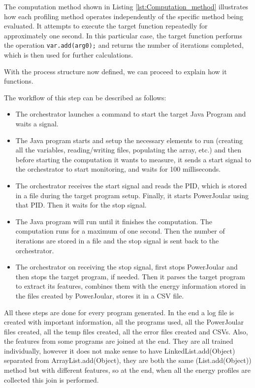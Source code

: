 The computation method shown in Listing \ref{lst:Computation_method} illustrates how each profiling method operates independently of the specific method being evaluated. It attempts to execute the target function repeatedly for approximately one second. In this particular case, the target function performs the operation \texttt{var.add(arg0);} and returns the number of iterations completed, which is then used for further calculations.


With the process structure now defined, we can proceed to explain how it functions.

The workflow of this step can be described as follows:

\begin{itemize}
  \item The orchestrator launches a command to start the target Java Program and waits a signal.
  \item The Java program starts and setup the necessary elements to run (creating all the variables, reading/writing files, populating the array, etc.) and then before starting the computation it wants to measure, it sends a start signal to the orchestrator to start monitoring, and waits for 100 milliseconds.
  \item The orchestrator receives the start signal and reads the PID, which is stored in a file during the target program setup. Finally, it starts PowerJoular using that PID. Then it waits for the stop signal.
  \item The Java program will run until it finishes the computation. The computation runs for a maximum of one second. Then the number of iterations are stored in a file and the stop signal is sent back to the orchestrator.
  \item The orchestrator on receiving the stop signal, first stops PowerJoular and then stops the target program, if needed. Then it parses the target program to extract its features, combines them with the energy information stored in the files created by PowerJoular, stores it in a CSV file.
\end{itemize}

All these steps are done for every program generated. In the end a log file is created with important information, all the programs used, all the PowerJoular files created, all the temp files created, all the error files created and CSVs.
Also, the features from some programs are joined at the end. They are all trained individually, however it does not make sense to have LinkedList.add(Object) separated from ArrayList.add(Object), they are both the same (List.add(Object)) method but with different features, so at the end, when all the energy profiles are collected this join is performed.

